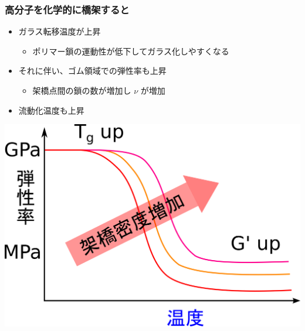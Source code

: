 \documentclass[12pt, dvipdfmx]{beamer}
\begin{document}
\begin{frame}
	\frametitle{高分子を化学的に橋架すると}
					\begin{itemize}
						\item ガラス転移温度が上昇
						\begin{itemize}
							\item ポリマー鎖の運動性が低下してガラス化しやすくなる
						\end{itemize}
						\item それに伴い、ゴム領域での弾性率も上昇
						\begin{itemize}
							\item 架橋点間の鎖の数が増加し $\nu$ が増加
						\end{itemize}
                        \item \alert{流動化温度も上昇}
					\end{itemize}
						\centering
						\includegraphics[width=.45\textwidth]{polymer_spectrum_3.png}
\end{frame}
\end{document}
